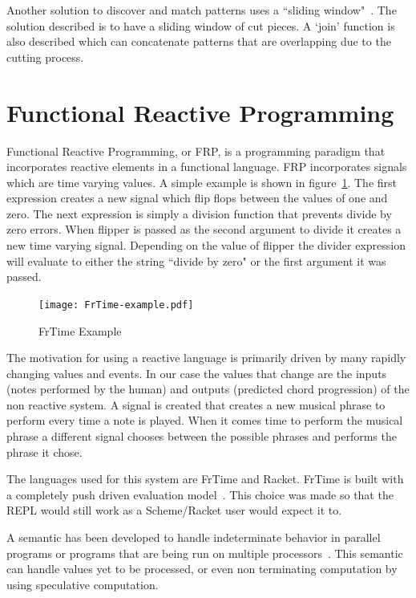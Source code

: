 \documentclass[12pt]{ucthesis}
\newcommand{\captionfonts}{\small\bf\ssp}
\begin{document}
Another solution to discover and match patterns uses a ``sliding window"~\cite{slidingWindow}. The solution described is to have a sliding window of cut pieces. A `join' function is also described which can concatenate patterns that are overlapping due to the cutting process.



\section{Functional Reactive Programming}
\label{rw:frp}


Functional Reactive Programming, or FRP, is a programming paradigm that incorporates reactive elements in a functional language. FRP incorporates signals which are time varying values. A simple example is shown in figure~\ref{fig:FrTime-example}. The first expression creates a new signal which flip flops between the values of one and zero. The next expression is simply a division function that prevents divide by zero errors. When flipper is passed as the second argument to divide it creates a new time varying signal. Depending on the value of flipper the divider expression will evaluate to either the string ``divide by zero" or the first argument it was passed.

\begin{figure}
\texttt{[image: FrTime-example.pdf]}
\captionfonts
\caption[FrTime Example]{FrTime Example}
\label{fig:FrTime-example}
\end{figure}

The motivation for using a reactive language is primarily driven by many rapidly changing values and events. In our case the values that change are the inputs (notes performed by the human) and outputs (predicted chord progression) of the non reactive system. A signal is created that creates a new musical phrase to perform every time a note is played. When it comes time to perform the musical phrase a different signal chooses between the possible phrases and performs the phrase it chose.

The languages used for this system are FrTime and Racket. FrTime is built with a completely push driven evaluation model~\cite{FrTime}. This choice was made so that the REPL would still work as a Scheme/Racket user would expect it to.

A semantic has been developed to handle indeterminate behavior in parallel programs or programs that are being run on multiple processors~\cite{historic-paper}. This semantic can handle values yet to be processed, or even non terminating computation by using speculative computation. 
\end{document}
